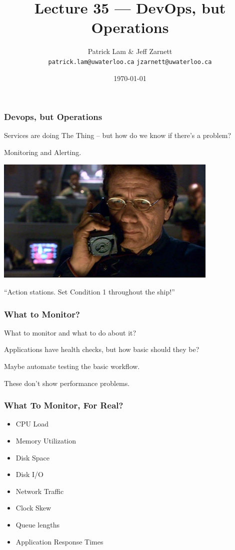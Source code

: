 

\title{Lecture 35 --- DevOps, but Operations }

\author{Patrick Lam \& Jeff Zarnett \\ \small \texttt{patrick.lam@uwaterloo.ca} \texttt{jzarnett@uwaterloo.ca}}
\date{\today}




\begin{frame}
  \titlepage

 \end{frame}


\begin{frame}
\frametitle{Devops, but Operations}

Services are doing The Thing -- but how do we know if there's a problem?

Monitoring and Alerting.

\begin{center}
	\includegraphics[width=0.8\textwidth]{images/adama.jpg}
\end{center}
``Action stations. Set Condition 1 throughout the ship!''
\end{frame}


\begin{frame}
\frametitle{What to Monitor?}

What to monitor and what to do about it?

Applications have health checks, but how basic should they be?

Maybe automate testing the basic workflow.

These don't show performance problems.

\end{frame}


\begin{frame}
\frametitle{What To Monitor, For Real?}


\begin{itemize}
	\item CPU Load
	\item Memory Utilization
	\item Disk Space
	\item Disk I/O
	\item Network Traffic
	\item Clock Skew
	\item Queue lengths
	\item Application Response Times
\end{itemize}

\end{frame}


